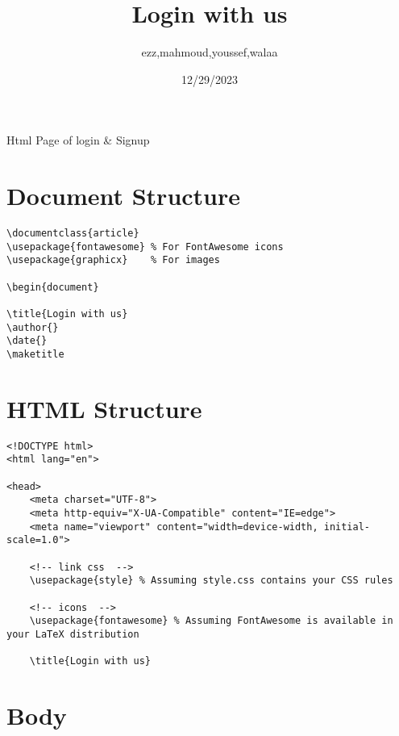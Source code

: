 \documentclass{article}
\begin{document}
\title{Login with us}
\author{ezz,mahmoud,youssef,walaa}
\date{12/29/2023}
\maketitle
Html Page of login & Signup

\section*{Document Structure}

\begin{verbatim}
\documentclass{article}
\usepackage{fontawesome} % For FontAwesome icons
\usepackage{graphicx}    % For images

\begin{document}

\title{Login with us}
\author{}
\date{}
\maketitle
\end{verbatim}

\section*{HTML Structure}

\begin{verbatim}
<!DOCTYPE html>
<html lang="en">

<head>
    <meta charset="UTF-8">
    <meta http-equiv="X-UA-Compatible" content="IE=edge">
    <meta name="viewport" content="width=device-width, initial-scale=1.0">

    <!-- link css  -->
    \usepackage{style} % Assuming style.css contains your CSS rules

    <!-- icons  -->
    \usepackage{fontawesome} % Assuming FontAwesome is available in your LaTeX distribution

    \title{Login with us}
\end{verbatim}

\section*{Body}
\end{document}
